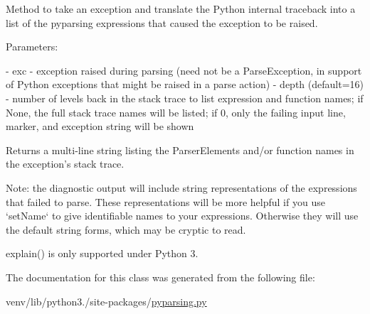 \begin{DoxyVerb}Method to take an exception and translate the Python internal traceback into a list
of the pyparsing expressions that caused the exception to be raised.

Parameters:

 - exc - exception raised during parsing (need not be a ParseException, in support
   of Python exceptions that might be raised in a parse action)
 - depth (default=16) - number of levels back in the stack trace to list expression
   and function names; if None, the full stack trace names will be listed; if 0, only
   the failing input line, marker, and exception string will be shown

Returns a multi-line string listing the ParserElements and/or function names in the
exception's stack trace.

Note: the diagnostic output will include string representations of the expressions
that failed to parse. These representations will be more helpful if you use `setName` to
give identifiable names to your expressions. Otherwise they will use the default string
forms, which may be cryptic to read.

explain() is only supported under Python 3.
\end{DoxyVerb}
 

The documentation for this class was generated from the following file\+:\begin{DoxyCompactItemize}
\item 
venv/lib/python3./site-\/packages/\hyperlink{pyparsing_8py}{pyparsing.\+py}\end{DoxyCompactItemize}
